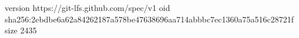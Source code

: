 version https://git-lfs.github.com/spec/v1
oid sha256:2ebdbe6a62a84262187a578be47638696aa714abbbc7ec1360a75a516c28721f
size 2435
